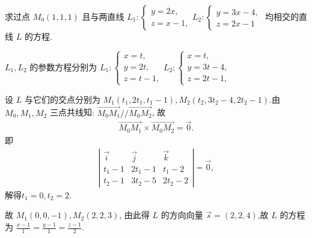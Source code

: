\begin{example}
	求过点 $M_0(1,1,1)$ 且与两直线 $L_1:\left\{\begin{array}{l}y=2 x, \\ z=x-1,\end{array} L_2:\left\{\begin{array}{l}y=3 x-4, \\ z=2 x-1\end{array}\right.\right.$ 均相交的直线 $L$ 的方程.
\end{example}
\begin{solution}
	$L_1 ,  L_2$ 的参数方程分别为 $L_1:\left\{\begin{array}{l}x=t, \\ y=2 t, \\ z=t-1,\end{array} L_2:\left\{\begin{array}{l}x=t, \\ y=3 t-4, \\ z=2 t-1,\end{array}\right.\right.$

	设 $L$ 与它们的交点分别为 $M_1\left(t_1, 2 t_1, t_1-1\right), M_2\left(t_2, 3 t_2-4,2 t_2-1\right)$.由 $M_0 ,  M_1 ,  M_2$ 三点共线知: $\overrightarrow{M_0 M_1} / / \overrightarrow{M_0 M_2}$, 故
	\begin{align*}
		\overrightarrow{M_0 M_1} \times \overrightarrow{M_0 M_2} = \vec{0} .
	\end{align*}
	即
	\begin{align*}
		\left|\begin{array}{ccc}
			      \vec{i} & \vec{j} & \vec{k} \\
			      t_1-1   & 2t_1-1  & t_1-2   \\
			      t_2-1   & 3t_2-5  & 2t_2-2
		      \end{array}\right|=\vec{0},
	\end{align*}
	解得$t_1=0, t_2=2$.

	故 $M_1(0,0,-1), M_2(2,2,3)$, 由此得 $L$ 的方向向量 $\vec{s}=(2,2,4)$,故 $L$ 的方程为 $\frac{x-1}{1}=\frac{y-1}{1}=\frac{z-1}{2}$.
\end{solution}

